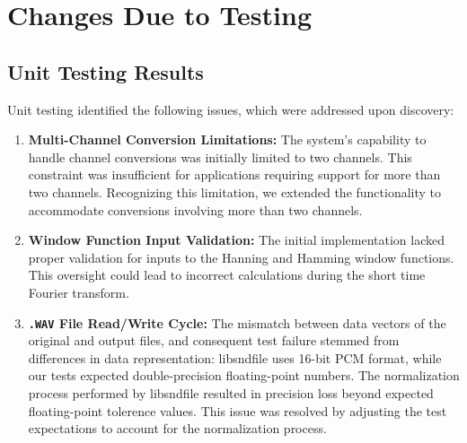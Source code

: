 \documentclass[12pt, titlepage]{article}
\begin{document}
\section{Changes Due to Testing}
\subsection{Unit Testing Results}
Unit testing identified the following issues, which were addressed upon discovery:
\begin{enumerate}
  \item \textbf{Multi-Channel Conversion Limitations:} The system's capability to handle channel conversions was 
  initially limited to two channels. This constraint was insufficient for applications requiring support 
  for more than two channels. Recognizing this limitation, we extended the functionality to accommodate 
  conversions involving more than two channels.
  \item \textbf{Window Function Input Validation:} The initial implementation lacked proper validation for inputs 
  to the Hanning and Hamming window functions. This oversight could lead to incorrect calculations during 
  the short time Fourier transform.
  \item \textbf{\texttt{.WAV} File Read/Write Cycle:} The mismatch between data vectors of the original and output files, and consequent 
  test failure stemmed from differences in data representation: libsndfile uses 16-bit PCM format, while our tests expected 
  double-precision floating-point numbers. The normalization process performed by libsndfile resulted in precision loss beyond
  expected floating-point tolerence values. This issue was resolved by adjusting the test expectations to account for the
  normalization process.
\end{enumerate}
\end{document}
